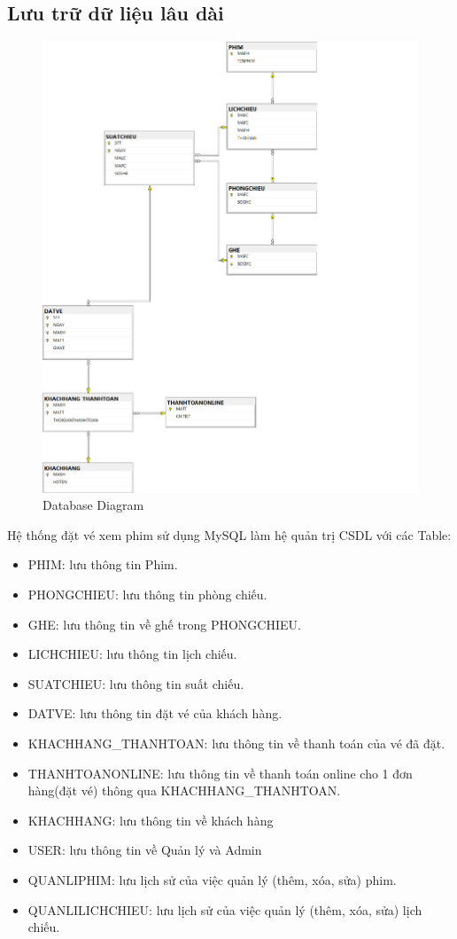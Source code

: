 \documentclass[a4paper, 12pt]{article}
\begin{document}
\subsection{Lưu trữ dữ liệu lâu dài}
\begin{figure}[H]
	\begin{center}
		\includegraphics[scale = 0.25]{image/4.4.png}
		\caption{Database Diagram}
	\end{center}
\end{figure}

Hệ thống đặt vé xem phim sử dụng MySQL làm hệ quản trị CSDL với các Table:
\begin{itemize}
	\item PHIM: lưu thông tin Phim.
	\item PHONGCHIEU: lưu thông tin phòng chiếu.
	\item GHE: lưu thông tin về ghế trong PHONGCHIEU.
	\item LICHCHIEU: lưu thông tin lịch chiếu.
	\item SUATCHIEU: lưu thông tin suất chiếu.
	\item DATVE: lưu thông tin đặt vé của khách hàng.
	\item KHACHHANG\_THANHTOAN: lưu thông tin về thanh toán của vé đã đặt.
	\item THANHTOANONLINE: lưu thông tin về thanh toán online cho 1 đơn hàng(đặt vé) thông qua KHACHHANG\_THANHTOAN.
	\item KHACHHANG: lưu thông tin về khách hàng
	\item USER: lưu thông tin về Quản lý và Admin
	\item QUANLIPHIM: lưu lịch sử của việc quản lý (thêm, xóa, sửa) phim.
	\item QUANLILICHCHIEU: lưu lịch sử của việc quản lý (thêm, xóa, sửa) lịch chiếu.
\end{itemize}	
\end{document}
